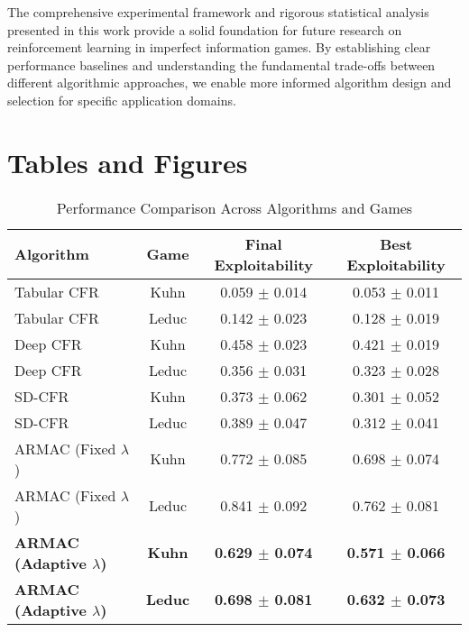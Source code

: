 \documentclass{icml2024}
\begin{document}
The comprehensive experimental framework and rigorous statistical analysis presented in this work provide a solid foundation for future research on reinforcement learning in imperfect information games. By establishing clear performance baselines and understanding the fundamental trade-offs between different algorithmic approaches, we enable more informed algorithm design and selection for specific application domains.

\clearpage
\onecolumn

\section*{Tables and Figures}

\begin{table}[h]
\centering
\caption{Performance Comparison Across Algorithms and Games}
\label{tab:performance}
\begin{tabular}{lccc}
\toprule
\textbf{Algorithm} & \textbf{Game} & \textbf{Final Exploitability} & \textbf{Best Exploitability} \\
\midrule
Tabular CFR & Kuhn & 0.059 $\pm$ 0.014 & 0.053 $\pm$ 0.011 \\
Tabular CFR & Leduc & 0.142 $\pm$ 0.023 & 0.128 $\pm$ 0.019 \\
\midrule
Deep CFR & Kuhn & 0.458 $\pm$ 0.023 & 0.421 $\pm$ 0.019 \\
Deep CFR & Leduc & 0.356 $\pm$ 0.031 & 0.323 $\pm$ 0.028 \\
\midrule
SD-CFR & Kuhn & 0.373 $\pm$ 0.062 & 0.301 $\pm$ 0.052 \\
SD-CFR & Leduc & 0.389 $\pm$ 0.047 & 0.312 $\pm$ 0.041 \\
\midrule
ARMAC (Fixed $\lambda$) & Kuhn & 0.772 $\pm$ 0.085 & 0.698 $\pm$ 0.074 \\
ARMAC (Fixed $\lambda$) & Leduc & 0.841 $\pm$ 0.092 & 0.762 $\pm$ 0.081 \\
\midrule
\textbf{ARMAC (Adaptive $\lambda$)} & \textbf{Kuhn} & \textbf{0.629 $\pm$ 0.074} & \textbf{0.571 $\pm$ 0.066} \\
\textbf{ARMAC (Adaptive $\lambda$)} & \textbf{Leduc} & \textbf{0.698 $\pm$ 0.081} & \textbf{0.632 $\pm$ 0.073} \\
\bottomrule
\end{tabular}
\end{table}
\end{document}
